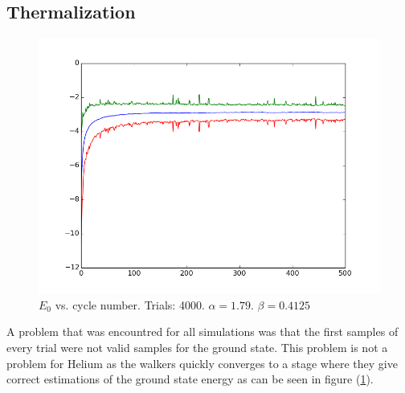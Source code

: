 \documentclass[twocolumn,fleqn,8pt]{article}  %
\begin{document}
\subsection{Thermalization}
\begin{figure}
	\includegraphics[width=\columnwidth]{../res/plot/helium_04/helium_04.png}
	\caption[caption]{$E_0$ vs. cycle number. 
	 	Trials: 4000. $\alpha = 1.79$. 
	$\beta = 0.4125$}
	\label{fig:helium_04}
\end{figure}
A problem that was encountred for all simulations was that the first samples of every 
trial were not valid samples for the ground state. This problem is not a problem for
Helium as the walkers quickly converges to a stage where they give correct
estimations of the ground state energy
as can be seen in figure (\ref{fig:helium_04}). 
\end{document}
